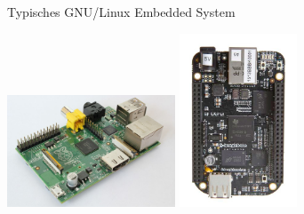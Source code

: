 \begin{frame}{Typisches GNU/Linux Embedded System}
	\begin{center}
		\includegraphics[width=5cm]{res/RaspberryPi.jpg}
		\includegraphics[width=3.5cm]{res/Beaglebone_Black.jpg}
	\end{center}
\end{frame}
